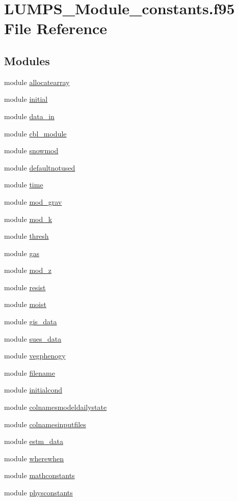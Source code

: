\hypertarget{_l_u_m_p_s___module__constants_8f95}{}\section{L\+U\+M\+P\+S\+\_\+\+Module\+\_\+constants.\+f95 File Reference}
\label{_l_u_m_p_s___module__constants_8f95}
\subsection*{Modules}
\begin{DoxyCompactItemize}
\item 
module \hyperlink{namespaceallocatearray}{allocatearray}
\item 
module \hyperlink{namespaceinitial}{initial}
\item 
module \hyperlink{namespacedata__in}{data\+\_\+in}
\item 
module \hyperlink{namespacecbl__module}{cbl\+\_\+module}
\item 
module \hyperlink{namespacesnowmod}{snowmod}
\item 
module \hyperlink{namespacedefaultnotused}{defaultnotused}
\item 
module \hyperlink{namespacetime}{time}
\item 
module \hyperlink{namespacemod__grav}{mod\+\_\+grav}
\item 
module \hyperlink{namespacemod__k}{mod\+\_\+k}
\item 
module \hyperlink{namespacethresh}{thresh}
\item 
module \hyperlink{namespacegas}{gas}
\item 
module \hyperlink{namespacemod__z}{mod\+\_\+z}
\item 
module \hyperlink{namespaceresist}{resist}
\item 
module \hyperlink{namespacemoist}{moist}
\item 
module \hyperlink{namespacegis__data}{gis\+\_\+data}
\item 
module \hyperlink{namespacesues__data}{sues\+\_\+data}
\item 
module \hyperlink{namespacevegphenogy}{vegphenogy}
\item 
module \hyperlink{namespacefilename}{filename}
\item 
module \hyperlink{namespaceinitialcond}{initialcond}
\item 
module \hyperlink{namespacecolnamesmodeldailystate}{colnamesmodeldailystate}
\item 
module \hyperlink{namespacecolnamesinputfiles}{colnamesinputfiles}
\item 
module \hyperlink{namespaceestm__data}{estm\+\_\+data}
\item 
module \hyperlink{namespacewherewhen}{wherewhen}
\item 
module \hyperlink{namespacemathconstants}{mathconstants}
\item 
module \hyperlink{namespacephysconstants}{physconstants}
\end{DoxyCompactItemize}
